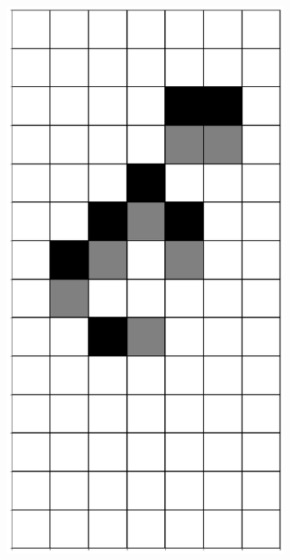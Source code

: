 \documentclass[12pt]{article}
\numberwithin{figure}{section} %
\begin{document}
\begin{figure}[H]
\begin{subfigure}{0.19\textwidth}
     \includegraphics[width=\linewidth]{Section4/16.3}
     \subcaption{}
   \end{subfigure}
           \begin{subfigure}{0.19\textwidth}
     \centering

\end{subfigure}
\end{figure}
\end{document}
